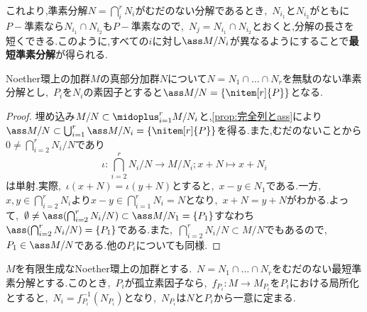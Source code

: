 これより,準素分解$N=\bigcap_i^r N_i$がむだのない分解であるとき,~$N_{i_1}$と$N_{i_2}$がともに$ P-$準素なら$N_{i_1}\cap N_{i_2}$も$ P-$準素なので,~$N_j=N_{i_1}\cap N_{i_2}$とおくと,分解の長さを短くできる.このように,すべての$i$に対し$\ass M/N_i$が異なるようにすることで\textbf{最短準素分解}が得られる.
\begin{thm}
	Noether環上の加群$M$の真部分加群$N$について$N=N_1\cap\dots\cap N_r$を無駄のない準素分解とし,~$ P_i$を$N_i$の素因子とすると$\ass M/N=\{\nitem[r]{ P}\}$となる.
\end{thm}
\begin{proof}
	埋め込み$M/N\subset\midoplus_{i=1}^rM/N_i$と,\ref{prop:完全列とass}により$\ass M/N\subset \bigcup_{i=1}^r\ass M/N_i=\{\nitem[r]{ P}\}$を得る.また,むだのないことから$0\neq\bigcap_{i=2}^r N_i/N$であり
	\[\iota:\bigcap_{i=2}^rN_i/N\longrightarrow M/N_i;x+N\longmapsto x+N_i\]
	は単射.実際,~$\iota(x+N)=\iota(y+N)$とすると,~$x-y\in N_1$である.一方,~$x,y\in\bigcap_{i=2}^rN_i$より$x-y\in\bigcap_{i=1}^rN_i=N$となり,~$x+N=y+N$がわかる.よって,~$\emptyset\neq\ass(\bigcap_{i=2}^r N_i/N)\subset\ass M/N_1=\{ P_1\}$すなわち$\ass(\bigcap_{i=2}^r N_i/N)=\{ P_1\}$である.また,~$\bigcap_{i=2}^r N_i/N\subset M/N$でもあるので,~$ P_1\in\ass M/N$である.他の$ P_i$についても同様.
\end{proof}
\begin{thm}
	$M$を有限生成なNoether環上の加群とする.~$N=N_1\cap\dots\cap N_r$をむだのない最短準素分解とする.このとき,~$ P_i$が孤立素因子なら,~$f_{ P_i}:M\longrightarrow M_{ P_i}$を$ P_i$における局所化とすると,~$N_i=f^{-1}_{ P_i}(N_{ P_i})$となり,~$N_{ P_i}$は$N$と$ P_i$から一意に定まる.
\end{thm}
